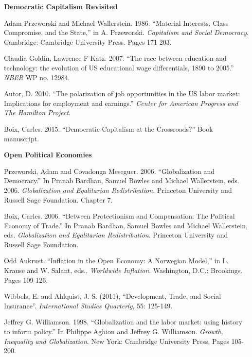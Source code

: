 \documentclass[letterpaper]{article}
\renewenvironment{itemize}{
  \begin{list}{}{
    \setlength{\leftmargin}{1.5em}
  }
}{
  \end{list}
}
\begin{document}
\begin{enumerate}
\item {\bf Democratic Capitalism Revisited}

	\begin{itemize}
		\item[$\bullet$] Adam Przeworski and Michael Wallerstein. 1986. ``Material Interests, Class Compromise, and the State,'' in A. Przeworski. \emph{Capitalism and Social Democracy}. Cambridge: Cambridge University Press. Pages 171-203.
		\item[$\bullet$] Claudia Goldin, Lawrence F Katz. 2007. ``The race between education and technology: the evolution of US educational wage differentials, 1890 to 2005.'' \emph{NBER} WP no. 12984.
		\item[$\bullet$] Autor, D. 2010. ``The polarization of job opportunities in the US labor market: Implications for employment and earnings.'' \emph{Center for American Progress and The Hamilton Project}.
		\item[$\bullet$] Boix, Carles. 2015. ``Democratic Capitalism at the Crossroads?'' Book manuscript. 
	\end{itemize}


\item {\bf Open Political Economies}

	\begin{itemize}
		\item[$\bullet$] Przeworski, Adam and Covadonga Meseguer. 2006. ``Globalization and Democracy.'' In Pranab Bardhan, Samuel Bowles and Michael Wallerstein, eds. 2006. \emph{Globalization and Egalitarian Redistribution}. Princeton University and Russell Sage Foundation. Chapter 7.
		\item[$\bullet$] Boix, Carles. 2006. ``Between Protectionism and Compensation: The Political Economy of Trade.'' In Pranab Bardhan, Samuel Bowles and Michael Wallerstein, eds. \emph{Globalization and Egalitarian Redistribution}. Princeton University and Russell Sage Foundation.
		\item[$\bullet$] Odd Aukrust. ``Inflation in the Open Economy: A Norwegian Model,'' in L. Krause and W. Salant, eds., \emph{Worldwide Inflation}. Washington, D.C.: Brookings. Pages 109-126.
		\item[$\bullet$] Wibbels, E. and Ahlquist, J. S. (2011), ``Development, Trade, and Social Insurance''. \emph{International Studies Quarterly}, 55: 125-149.
		\item[$\bullet$] Jeffrey G. Williamson. 1998. ``Globalization and the labor market: using history to inform policy.'' In Philippe Aghion and Jeffrey G. Williamson. \emph{Growth, Inequality and Globalization}. New York: Cambridge University Press. Pages 105-200. 
	\end{itemize}



\end{enumerate}




  


  










%
%
\end{document}
